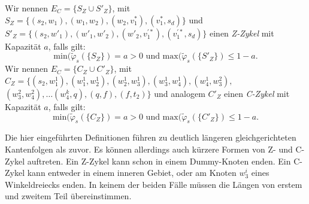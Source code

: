\begin{definition}
Wir nennen $E_C=\{S_Z \cup S'_Z\}$, mit  $S_Z = \{(s_2,w_1),(w_1,w_2),(w_2,v_1^*),(v_1^*,s_d)\}$ und $S'_Z=\{(s_2,w'_1),(w'_1,w'_2),(w'_2,v^{'*}_1),(v^{'*}_1,s_d)\}$ einen \textit{Z-Zykel} mit Kapazität $a$, falls gilt: 
$$\text{min}(\tilde{\varphi}_s(\{S_Z\}) = a > 0 \text{ und } \text{max}(\tilde{\varphi}_s(\{S'_Z\}) \leq 1 - a.$$
Wir nennen $E_C=\{C_Z \cup C'_Z\}$, mit  $C_Z = \{(s_2,w^1_1), (w^1_1,w^1_2), (w^1_2,w^1_3), (w^1_3,w^1_4), (w^1_4,w^2_3), $ $(w^2_3,w^2_4), \ldots (w^k_4,q),(q,f),(f,t_2)\}$ und analogem $C'_Z$ einen \textit{C-Zykel} mit Kapazität $a$, falls gilt: 
$$\text{min}(\tilde{\varphi}_s(\{C_Z\}) = a > 0 \text{ und } \text{max}(\tilde{\varphi}_s(\{C'_Z\}) \leq 1 - a.$$
\end{definition}

\begin{remark}
Die hier eingeführten Definitionen führen zu deutlich längeren gleichgerichteten Kantenfolgen als zuvor. Es können allerdings auch kürzere Formen von Z- und C-Zykel auftreten. Ein Z-Zykel kann schon in einem Dummy-Knoten enden. Ein C-Zykel kann entweder in einem inneren Gebiet, oder am Knoten $w^{i}_3$ eines Winkel\-dreiecks enden. In keinem der beiden Fälle müssen die Längen von erstem und zweitem Teil übereinstimmen.
\end{remark}

